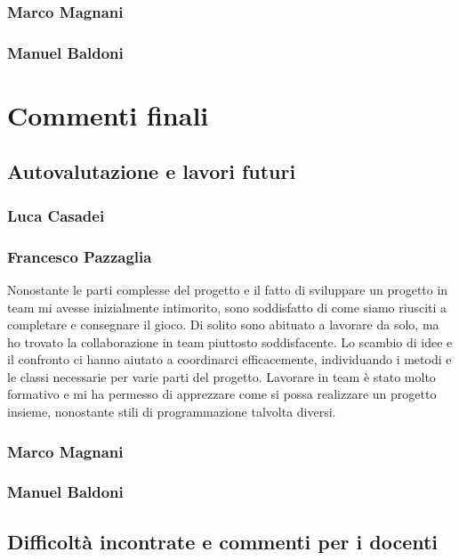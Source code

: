 \documentclass[a4paper,12pt]{report}
\begin{document}
\subsection*{Marco Magnani}
\subsection*{Manuel Baldoni}

\chapter{Commenti finali}

\section{Autovalutazione e lavori futuri}

\subsection*{Luca Casadei}
\subsection*{Francesco Pazzaglia}

Nonostante le parti complesse del progetto e il fatto di sviluppare un progetto in team mi avesse inizialmente intimorito, sono soddisfatto di come siamo riusciti a completare e consegnare il gioco. Di solito sono abituato a lavorare da solo, ma ho trovato la collaborazione in team piuttosto soddisfacente. Lo scambio di idee e il confronto ci hanno aiutato a coordinarci efficacemente, individuando i metodi e le classi necessarie per varie parti del progetto. Lavorare in team è stato molto formativo e mi ha permesso di apprezzare come si possa realizzare un progetto insieme, nonostante stili di programmazione talvolta diversi.

\subsection*{Marco Magnani}
\subsection*{Manuel Baldoni}

\section{Difficoltà incontrate e commenti per i docenti}
\end{document}
